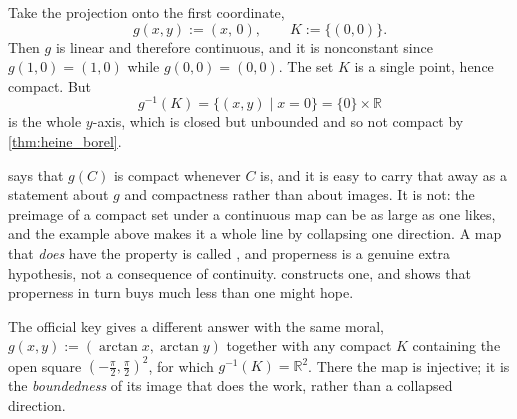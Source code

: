 \begin{exercisesolution}
\label{sol:box_preimage_of_compact_not_compact}
Take the projection onto the first coordinate,
\[g(x,y) := (x,\,0), \qquad K := \{(0,0)\}.\]
Then $g$ is linear and therefore continuous, and it is nonconstant since $g(1,0) = (1,0)$ while
$g(0,0) = (0,0)$. The set $K$ is a single point, hence compact. But
\[g^{-1}(K) = \{(x,y) \mid x = 0\} = \{0\}\times\mathbb{R}\]
is the whole $y$-axis, which is closed but unbounded and so not compact by
\cref{thm:heine_borel}.

\begin{remark}
 says that $g(C)$ is compact whenever $C$ is, and it is easy
to carry that away as a statement about $g$ and compactness rather than about images. It is not:
the preimage of a compact set under a continuous map can be as large as one likes, and the
example above makes it a whole line by collapsing one direction. A map that \emph{does} have the
property is called , and properness is a genuine extra hypothesis, not a
consequence of continuity.  constructs one, and shows
that properness in turn buys much less than one might hope.

The official key gives a different answer with the same moral, $g(x,y) := (\arctan x, \arctan y)$
together with any compact $K$ containing the open square $(-\tfrac\pi2,\tfrac\pi2)^2$, for which
$g^{-1}(K) = \mathbb{R}^2$. There the map is injective; it is the \emph{boundedness} of its
image that does the work, rather than a collapsed direction.
\end{remark}
\end{exercisesolution}

